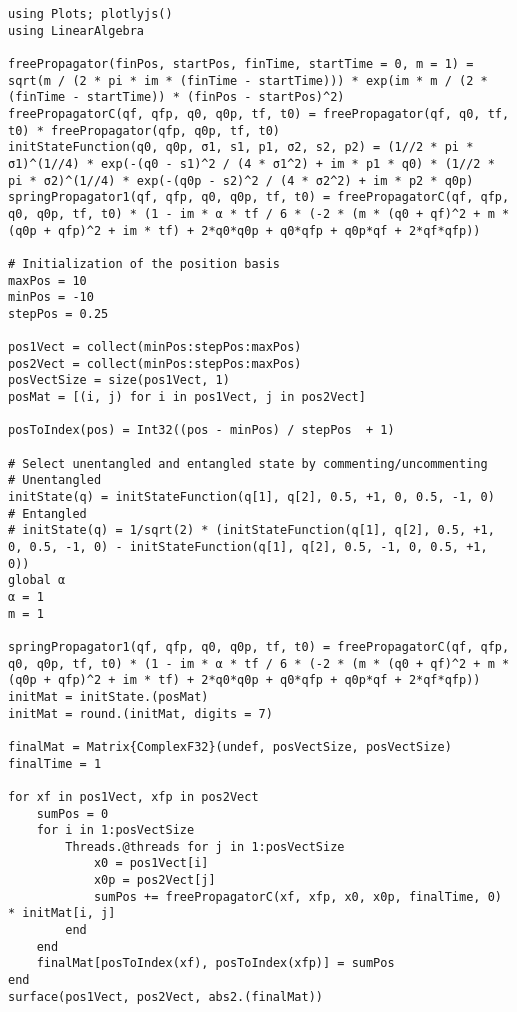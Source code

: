 \begin{verbatim}
using Plots; plotlyjs()
using LinearAlgebra

freePropagator(finPos, startPos, finTime, startTime = 0, m = 1) = sqrt(m / (2 * pi * im * (finTime - startTime))) * exp(im * m / (2 * (finTime - startTime)) * (finPos - startPos)^2)  
freePropagatorC(qf, qfp, q0, q0p, tf, t0) = freePropagator(qf, q0, tf, t0) * freePropagator(qfp, q0p, tf, t0)
initStateFunction(q0, q0p, σ1, s1, p1, σ2, s2, p2) = (1//2 * pi * σ1)^(1//4) * exp(-(q0 - s1)^2 / (4 * σ1^2) + im * p1 * q0) * (1//2 * pi * σ2)^(1//4) * exp(-(q0p - s2)^2 / (4 * σ2^2) + im * p2 * q0p)
springPropagator1(qf, qfp, q0, q0p, tf, t0) = freePropagatorC(qf, qfp, q0, q0p, tf, t0) * (1 - im * α * tf / 6 * (-2 * (m * (q0 + qf)^2 + m * (q0p + qfp)^2 + im * tf) + 2*q0*q0p + q0*qfp + q0p*qf + 2*qf*qfp))

# Initialization of the position basis
maxPos = 10
minPos = -10
stepPos = 0.25

pos1Vect = collect(minPos:stepPos:maxPos)
pos2Vect = collect(minPos:stepPos:maxPos)
posVectSize = size(pos1Vect, 1)
posMat = [(i, j) for i in pos1Vect, j in pos2Vect]

posToIndex(pos) = Int32((pos - minPos) / stepPos  + 1)

# Select unentangled and entangled state by commenting/uncommenting
# Unentangled
initState(q) = initStateFunction(q[1], q[2], 0.5, +1, 0, 0.5, -1, 0)
# Entangled
# initState(q) = 1/sqrt(2) * (initStateFunction(q[1], q[2], 0.5, +1, 0, 0.5, -1, 0) - initStateFunction(q[1], q[2], 0.5, -1, 0, 0.5, +1, 0))
global α
α = 1
m = 1

springPropagator1(qf, qfp, q0, q0p, tf, t0) = freePropagatorC(qf, qfp, q0, q0p, tf, t0) * (1 - im * α * tf / 6 * (-2 * (m * (q0 + qf)^2 + m * (q0p + qfp)^2 + im * tf) + 2*q0*q0p + q0*qfp + q0p*qf + 2*qf*qfp))
initMat = initState.(posMat)
initMat = round.(initMat, digits = 7)

finalMat = Matrix{ComplexF32}(undef, posVectSize, posVectSize)
finalTime = 1

for xf in pos1Vect, xfp in pos2Vect
    sumPos = 0
    for i in 1:posVectSize
        Threads.@threads for j in 1:posVectSize
            x0 = pos1Vect[i]
            x0p = pos2Vect[j]
            sumPos += freePropagatorC(xf, xfp, x0, x0p, finalTime, 0) * initMat[i, j]
        end
    end
    finalMat[posToIndex(xf), posToIndex(xfp)] = sumPos
end
surface(pos1Vect, pos2Vect, abs2.(finalMat))
\end{verbatim}

